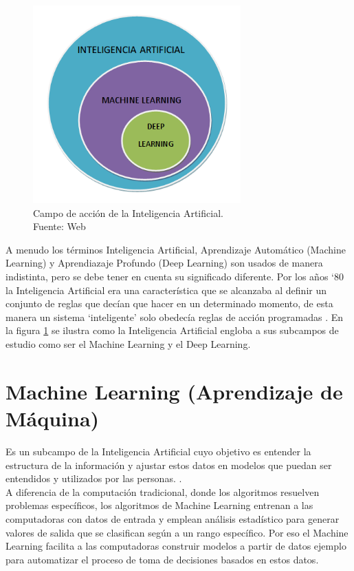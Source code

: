 \begin{figure}[H]
    \begin{center}
        \includegraphics[width=8cm]{img/capitulo_2/ia.png}
    \end{center}
    \caption{Campo de acción de la Inteligencia Artificial.\\Fuente: Web}
    \label{fig:ia}
\end{figure}

A menudo los términos Inteligencia Artificial, Aprendizaje Automático (Machine Learning) y Aprendiazaje Profundo (Deep Learning) son usados de manera indistinta, pero se debe tener en cuenta su significado diferente. Por los años `80 la Inteligencia Artificial era una característica que se alcanzaba al definir un conjunto de reglas que decían que hacer en un determinado momento, de esta manera un sistema `inteligente' solo obedecía reglas de acción programadas \cite{researchgate:ia}. En la figura \ref{fig:ia} se ilustra como la Inteligencia Artificial engloba a sus subcampos de estudio como ser el Machine Learning y el Deep Learning.

\section{Machine Learning (Aprendizaje de Máquina)}
Es un subcampo de la Inteligencia Artificial cuyo objetivo es entender la estructura de la información y ajustar estos datos en modelos que puedan ser entendidos y utilizados por las personas. \cite{digitalocean:machinelearning}.\\

A diferencia de la computación tradicional, donde los algoritmos resuelven problemas específicos, los algoritmos de Machine Learning entrenan a las computadoras con datos de entrada y emplean análisis estadístico para generar valores de salida que se clasifican según a un rango específico. Por eso el Machine Learning facilita a las computadoras construir modelos a partir de datos ejemplo para automatizar el proceso de toma de decisiones basados en estos datos.\\

